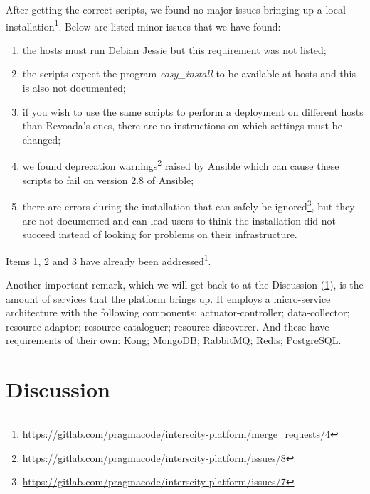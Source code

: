 \documentclass[paper=a4, fontsize=11pt]{scrartcl}
\numberwithin{equation}{section}    %
\numberwithin{figure}{section}      %
\numberwithin{table}{section}        %
\begin{document}
  After getting the correct scripts, we found no major issues bringing up a local installation\footnote{\label{installation-mr}\url{https://gitlab.com/pragmacode/interscity-platform/merge_requests/4}}. Below are listed minor issues that we have found:

  \begin{enumerate}
    \item the hosts must run Debian Jessie but this requirement was not listed;
    \item the scripts expect the program \textit{easy\_install} to be available at hosts and this is also not documented;
    \item if you wish to use the same scripts to perform a deployment on different hosts than Revoada's ones, there are no instructions on which settings must be changed;
    \item we found deprecation warnings\footnote{\url{https://gitlab.com/pragmacode/interscity-platform/issues/8}} raised by Ansible which can cause these scripts to fail on version 2.8 of Ansible;
    \item there are errors during the installation that can safely be ignored\footnote{\url{https://gitlab.com/pragmacode/interscity-platform/issues/7}}, but they are not documented and can lead users to think the installation did not succeed instead of looking for problems on their infrastructure.
  \end{enumerate}

  Items 1, 2 and 3 have already been addressed\textsuperscript{\ref{installation-mr}}.

  Another important remark, which we will get back to at the Discussion (\ref{sec:discussion}), is the amount of services that the platform brings up. It employs a micro-service architecture with the following components: actuator-controller; data-collector; resource-adaptor; resource-cataloguer; resource-discoverer. And these have requirements of their own: Kong; MongoDB; RabbitMQ; Redis; PostgreSQL.

  \section{Discussion}
  \label{sec:discussion}
\end{document}
